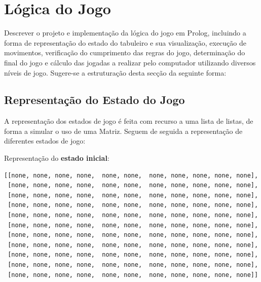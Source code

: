 \documentclass[a4paper]{article}
\begin{document}
\newpage

\section{Lógica do Jogo}

Descrever o projeto e implementação da lógica do jogo em Prolog, incluindo a forma de representação do estado do tabuleiro e sua visualização, execução de movimentos, verificação do cumprimento das regras do jogo, determinação do final do jogo e cálculo das jogadas a realizar pelo computador utilizando diversos níveis de jogo. Sugere-se a estruturação desta secção da seguinte forma:

\subsection{Representação do Estado do Jogo}

A representação dos estados de jogo é feita com recurso a uma lista de listas, de forma a simular o uso de uma Matriz. Seguem de seguida a representação de diferentes estados de jogo:\newline


Representação do \textbf{estado inicial}:

\begin{small}
\begin{lstlisting}
[[none, none, none, none,  none, none,  none, none, none, none, none],
 [none, none, none, none,  none, none,  none, none, none, none, none],
 [none, none, none, none,  none, none,  none, none, none, none, none],
 [none, none, none, none,  none, none,  none, none, none, none, none],
 [none, none, none, none,  none, none,  none, none, none, none, none],
 [none, none, none, none,  none, none,  none, none, none, none, none],
 [none, none, none, none,  none, none,  none, none, none, none, none],
 [none, none, none, none,  none, none,  none, none, none, none, none],
 [none, none, none, none,  none, none,  none, none, none, none, none],
 [none, none, none, none,  none, none,  none, none, none, none, none],
 [none, none, none, none,  none, none,  none, none, none, none, none]]
\end{lstlisting}
\end{small}
\end{document}
